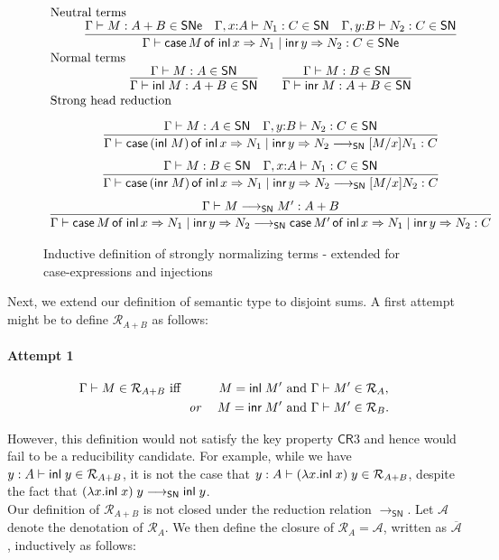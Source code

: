 \documentclass{article}
\newcommand{\SN}{\mathsf{SN}}
\newcommand{\SNe}{\mathsf{SNe}}
\newcommand{\CR}{\textsf{CR}}
\newcommand{\denot}[1]{\mathcal{R}_{#1}}
\newcommand{\inden}[3]{#1 \vdash #2 \in \denot{#3}}
\newcommand{\redSN}{\longrightarrow_\SN}
\newcommand{\clos}[1]{\overline{#1}}
\def\lv{\mathopen{{[\kern-0.14em[}}}    %
\def\rv{\mathclose{{]\kern-0.14em]}}}   %
\newcommand{\A}{\mathcal{A}}
\newcommand{\den}[1]{\lv #1 \rv}
\begin{document}
\begin{figure}
 \centering

\[
\begin{array}{c}
\multicolumn{1}{l}{\mbox{Neutral terms}} \\%
\infer{\Gamma \vdash \caseof{M}{N_1}{N_2} : C \in \SNe}{\Gamma \vdash M : A + B \in \SNe & \Gamma, x{:}A \vdash N_1 : C \in \SN & \Gamma, y{:}B \vdash N_2 : C\in \SN}
\\%
%
\multicolumn{1}{l}{\mbox{Normal terms}} \\%
\infer{\Gamma \vdash \inl M : A + B \in \SN}{\Gamma \vdash M : A \in \SN} \qquad \infer{\Gamma \vdash \inr M : A + B \in \SN}{\Gamma \vdash M : B \in \SN}
\\%
\multicolumn{1}{l}{\mbox{Strong head reduction}} \\[1em]
\infer{\Gamma \vdash \caseof{(\inl M)}{N_1}{N_2} \redSN [M/x]N_1 : C}{\Gamma \vdash M : A \in \SN & \Gamma, y{:}B \vdash N_2 : C \in \SN}
\\[0.75em]
\infer{\Gamma \vdash \caseof{(\inr M)}{N_1}{N_2} \redSN [M/x]N_2 : C}{\Gamma \vdash M : B \in \SN & \Gamma, x{:}A \vdash N_1 : C \in \SN}
\\[0.75em]
\infer{\Gamma \vdash \caseof{M}{N_1}{N_2} \redSN \caseof{M'}{N_1}{N_2} : C}{\Gamma \vdash M \redSN M' : A + B}
\end{array}
\]

   \caption{Inductive definition of strongly normalizing terms - extended for case-expressions and injections}
   \label{fig:sncase}
 \end{figure}


Next, we extend our definition of semantic type to disjoint sums. A first attempt might be to define $\denot{A + B}$ as follows:

\paragraph{Attempt 1}
\begin{alignat*}{3}
\inden{\Gamma}{M}{A + B} ~\text{iff} &&M = \inl M' &~\text{and}~ \inden{\Gamma}{M'}{A}, \\
& ~~\emph{or}~ &M = \inr M' &~\text{and}~ \inden{\Gamma}{M'}{B}.
\end{alignat*}

However, this definition would not satisfy the key property $\CR3$ and hence would fail to be a reducibility candidate. For example,  while we have $\inden{y : A}{\inl y}{A + B}$, it is not the case that $\inden{y : A}{(\lambda x. \inl x)\;y}{A + B}$, despite the fact that $(\lambda x. \inl x)\;y \redSN \inl y$.
\\[1em]
Our definition of $\denot{A + B}$ is not closed under the reduction relation $\redSN$. Let $\A$ denote the denotation of $\denot{A}$. We then define the closure of $\denot{A} = \A$, written as  $\clos\A$, inductively as follows:
\end{document}
